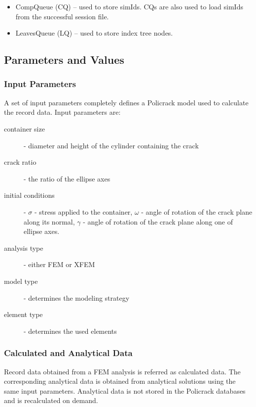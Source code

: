 \documentclass[10pt,a4paper]{article}
\begin{document}
\begin{itemize}
\item CompQueue (CQ) -- used to store simIds. CQs are also used to load simIds from the successful session file.
\item LeavesQueue (LQ) -- used to store index tree nodes.
\end{itemize}



\subsection{Parameters and Values}


\subsubsection{Input Parameters}

A set of input parameters completely defines a Policrack model used to calculate the record data. Input parameters are:

\begin{description}
\item[container size] - diameter and height of the cylinder containing the crack
\item[crack ratio] - the ratio of the ellipse axes
\item[initial conditions] - $\sigma$ - stress applied to the container, $\omega$ - angle of rotation of the crack plane along its normal, $\gamma$ - angle of rotation of the crack plane along one of ellipse axes.
\item[analysis type] - either FEM or XFEM
\item[model type] - determines the modeling strategy
\item[element type] - determines the used elements
\end{description}



\subsubsection{Calculated and Analytical Data}

Record data obtained from a FEM analysis is referred as calculated data. The corresponding analytical data is obtained from analytical solutions using the same input parameters. Analytical data is not stored in the Policrack databases and is recalculated on demand.
\end{document}
